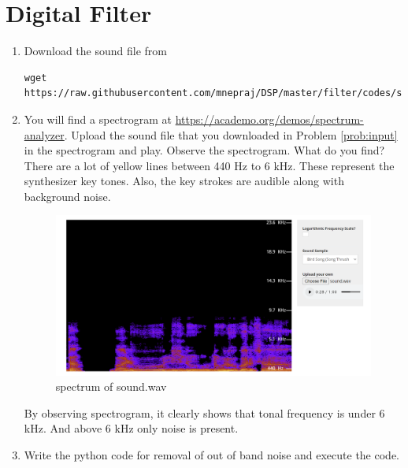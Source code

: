\documentclass[journal, 12pt, twocolumn]{IEEEtran}
\renewcommand\thesection{\arabic{section}}
\begin{document}
\section{Digital Filter}
\begin{enumerate}[label=\thesection.\arabic*
		,ref=\thesection.\theenumi]
	\item
	      \label{prob:input}
	      Download the sound file from
	      \begin{lstlisting}
wget https://raw.githubusercontent.com/mnepraj/DSP/master/filter/codes/sound.wav
\end{lstlisting}
	\item
	      \label{prob:spectrogram}
	      You will find a spectrogram at \href{https://academo.org/demos/spectrum-analyzer}{\url{https://academo.org/demos/spectrum-analyzer}}.
	      Upload the sound file that you downloaded in Problem \ref{prob:input} in the spectrogram  and play.  Observe the spectrogram. What do you find?
	      \\
	      \solution There are a lot of yellow lines between 440 Hz to 6 kHz.  These represent the synthesizer key tones. Also, the key strokes
	      are audible along with background noise.
	      \begin{figure}[h]
		      \centering
		      \includegraphics[width=\columnwidth]{figs/sound.png}
		      \caption{spectrum of sound.wav}
		      \label{fig:audiospectrum}
	      \end{figure}
	      By observing spectrogram, it clearly shows that tonal frequency is under 6 kHz. And above 6 kHz only noise is present.
	\item
	      \label{prob:output}
	      Write the python code for removal of out of band noise and execute the code.
	      \\
	      \solution
	      


\end{enumerate}
\end{document}
